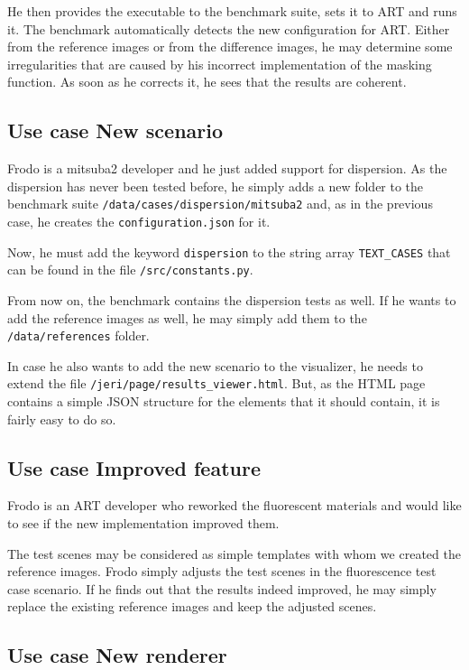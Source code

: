 He then provides the executable to the benchmark suite, sets it to ART and runs it. The benchmark automatically detects the new configuration for ART. Either from the reference images or from the difference images, he may determine some irregularities that are caused by his incorrect implementation of the masking function. As soon as he corrects it, he sees that the results are coherent.

\subsection{Use case New scenario}

Frodo is a mitsuba2 developer and he just added support for dispersion. As the dispersion has never been tested before, he simply adds a new folder to the benchmark suite \texttt{/data/cases/dispersion/mitsuba2} and, as in the previous case, he creates the \texttt{configuration.json} for it.

Now, he must add the keyword \texttt{dispersion} to the string array \texttt{TEXT\_CASES} that can be found in the file \texttt{/src/constants.py}.

From now on, the benchmark contains the dispersion tests as well. If he wants to add the reference images as well, he may simply add them to the \texttt{/data/references} folder.

In case he also wants to add the new scenario to the visualizer, he needs to extend the file \texttt{/jeri/page/results\_viewer.html}. But, as the HTML page contains a simple JSON structure for the elements that it should contain, it is fairly easy to do so.

\subsection{Use case Improved feature}

Frodo is an ART developer who reworked the fluorescent materials and would like to see if the new implementation improved them.

The test scenes may be considered as simple templates with whom we created the reference images. Frodo simply adjusts the test scenes in the fluorescence test case scenario. If he finds out that the results indeed improved, he may simply replace the existing reference images and keep the adjusted scenes.

\subsection{Use case New renderer}

